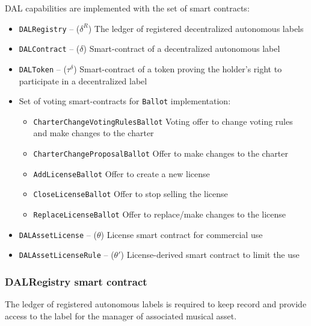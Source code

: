 \documentclass[12pt]{report}
\newcommand{\hlc}[1]{\colorbox{yellow!25}{#1}}
\def\code#1{\colorbox{light-gray}{\texttt{#1}}}
\begin{document}
DAL capabilities are implemented with the set of smart contracts:
\begin{itemize}
	\item\code{DALRegistry} – ($\delta^R$)\hfill\null\linebreak
	The ledger of registered decentralized autonomous labels
	\item\code{DALContract} – ($\delta$)\hfill\null\linebreak
	Smart-contract of a decentralized autonomous label
	\item\code{DALToken} – ($\tau^\delta$)\hfill\null\linebreak
	Smart-contract of a token proving the holder's right to participate in a decentralized label
	\item \hlc{Set of voting smart-contracts} for \code{Ballot} implementation:
	\begin{itemize}
		\item\code{CharterChangeVotingRulesBallot}
		Voting offer to change voting rules and make changes to the charter
		\item\code{CharterChangeProposalBallot}\hfill\null\linebreak
		Offer to make changes to the charter
		\item\code{AddLicenseBallot}\hfill\null\linebreak
		Offer to create a new license
		\item\code{CloseLicenseBallot}\hfill\null\linebreak
		Offer to stop selling the license
		\item\code{ReplaceLicenseBallot}\hfill\null\linebreak
		Offer to replace/make changes to the license
	\end{itemize}
\item\code{DALAssetLicense} – ($\theta$)\hfill\null\linebreak
License smart contract for commercial use
\item\code{DALAssetLicenseRule} – ($\theta'$)\hfill\null\linebreak
License-derived smart contract to limit the use 
\end{itemize}
\vfill\null\pagebreak
\subsubsection{DALRegistry smart contract}
\label{tech-apps-dal-registry}
The ledger of registered autonomous labels is required to keep record and provide access to the label for the manager of associated musical asset.
\end{document}
